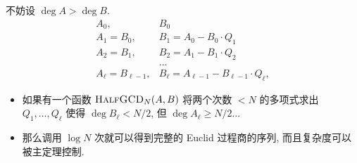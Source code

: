 \documentclass{ctexbeamer}
\begin{document}
\begin{frame}
  
  不妨设 $\deg A > \deg B$.
  \begin{align}
    A_0, & B_0\\
    A_1 = B_0, & B_1 = A_0 - B_0 \cdot Q_1\\
    A_2 = B_1, & B_2 = A_1 - B_1 \cdot Q_2\\
    & \dots \\
    A_\ell = B_{\ell - 1}, & B_\ell = A_{\ell - 1} - B_{\ell-1} \cdot Q_\ell,
  \end{align}
  
  \begin{itemize}
    \pause
    \item 如果有一个函数 $\textsc{HalfGCD}_N(A,B)$ 将两个次数 $< N$ 的多项式求出 $Q_1,\dots, Q_\ell$ 使得
    $\deg B_\ell < N/2$, 但 $\deg A_\ell \geq N/2$...
    \pause
    \item 那么调用 $\log N$ 次就可以得到完整的 Euclid 过程商的序列, 而且复杂度可以被主定理控制.
  \end{itemize}

\end{frame}
\end{document}
